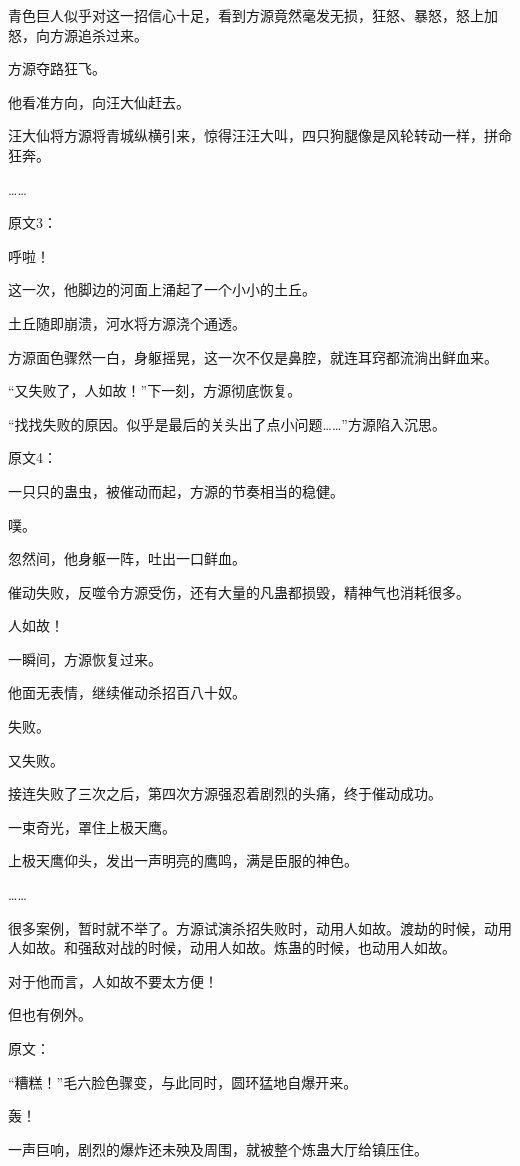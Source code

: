 \begin{this_body}
青色巨人似乎对这一招信心十足，看到方源竟然毫发无损，狂怒、暴怒，怒上加怒，向方源追杀过来。

方源夺路狂飞。

他看准方向，向汪大仙赶去。

汪大仙将方源将青城纵横引来，惊得汪汪大叫，四只狗腿像是风轮转动一样，拼命狂奔。

……

原文3：

呼啦！

这一次，他脚边的河面上涌起了一个小小的土丘。

土丘随即崩溃，河水将方源浇个通透。

方源面色骤然一白，身躯摇晃，这一次不仅是鼻腔，就连耳窍都流淌出鲜血来。

“又失败了，人如故！”下一刻，方源彻底恢复。

“找找失败的原因。似乎是最后的关头出了点小问题……”方源陷入沉思。

原文4：

一只只的蛊虫，被催动而起，方源的节奏相当的稳健。

噗。

忽然间，他身躯一阵，吐出一口鲜血。

催动失败，反噬令方源受伤，还有大量的凡蛊都损毁，精神气也消耗很多。

人如故！

一瞬间，方源恢复过来。

他面无表情，继续催动杀招百八十奴。

失败。

又失败。

接连失败了三次之后，第四次方源强忍着剧烈的头痛，终于催动成功。

一束奇光，罩住上极天鹰。

上极天鹰仰头，发出一声明亮的鹰鸣，满是臣服的神色。

……

很多案例，暂时就不举了。方源试演杀招失败时，动用人如故。渡劫的时候，动用人如故。和强敌对战的时候，动用人如故。炼蛊的时候，也动用人如故。

对于他而言，人如故不要太方便！

但也有例外。

原文：

“糟糕！”毛六脸色骤变，与此同时，圆环猛地自爆开来。

轰！

一声巨响，剧烈的爆炸还未殃及周围，就被整个炼蛊大厅给镇压住。


\end{this_body}
